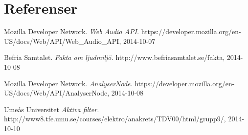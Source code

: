 \documentclass[12pt, titlepage, a4paper]{article}
\begin{document}
	\section{Referenser}
	\renewcommand{\addcontentsline}[3]{}%
  \renewcommand{\section}[2]{}%
  \begin{thebibliography}{1}

    Mozilla Developer Network.
    \emph{Web Audio API.}
    https://developer.mozilla.org/en-US/docs/Web/API/Web\_Audio\_API, 2014-10-07

    Befria Samtalet.
    \emph{Fakta om ljudmiljö.}
    http://www.befriasamtalet.se/fakta, 2014-10-08

    Mozilla Developer Network.
    \emph{AnalyserNode.}
    https://developer.mozilla.org/en-US/docs/Web/API/AnalyserNode, 2014-10-08

    Umeås Universitet
    \emph{Aktiva filter.}
    http://www8.tfe.umu.se/courses/elektro/anakrets/TDV00/html/grupp9/, 2014-10-10
  \end{thebibliography}
\end{document}
